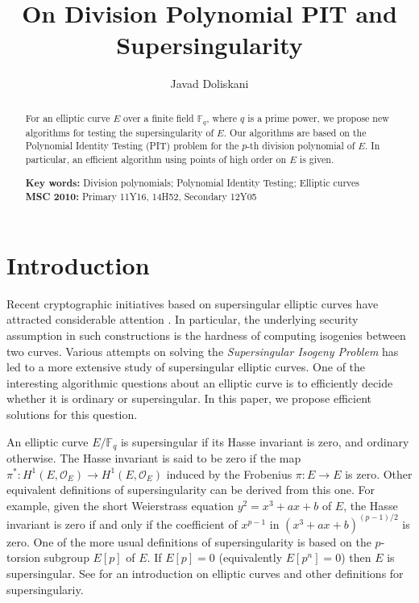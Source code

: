 \documentclass[12pt]{article}
\title{On Division Polynomial PIT and Supersingularity}
\author[1]{Javad Doliskani}
\affil[1]{\small Institute for Quantum Computing, University of Waterloo}
\date{}
\theoremstyle{plain}
\theoremstyle{definition}
\def\F{\ensuremath{\mathbb{F}}}
\begin{document}
\maketitle

\begin{abstract}
	\noindent For an elliptic curve $E$ over a finite field $\F_q$, where $q$ is a prime power, we 
	propose new algorithms for testing the supersingularity of $E$. Our algorithms are based on the 
	Polynomial Identity Testing (PIT) problem for the $p$-th division polynomial of $E$. In 
	particular, an efficient algorithm using points of high order on $E$ is given.
	
	\vspace*{7mm}
	\noindent\textbf{Key words:} Division polynomials; Polynomial Identity Testing; Elliptic curves 
	\\
	\noindent\textbf{MSC 2010:} Primary 11Y16, 14H52, Secondary 12Y05
\end{abstract}




\section{Introduction}
\label{sec:intro}

Recent cryptographic initiatives based on supersingular elliptic curves have attracted considerable 
attention \cite{Jao2011, Jao2014, Charles2009}. In particular, the underlying security assumption 
in such constructions is the hardness of computing isogenies between two curves. Various attempts 
on solving the \textit{Supersingular Isogeny Problem} has led to a more extensive study of 
supersingular elliptic curves. One of the interesting algorithmic questions about an elliptic curve 
is to efficiently decide whether it is ordinary or supersingular. In this paper, we propose 
efficient solutions for this question.

An elliptic curve $E / \F_q$ is supersingular if its Hasse invariant is zero, and ordinary 
otherwise. The Hasse invariant is said to be zero if the map $\pi^*: H^1(E, \mathscr{O}_E) 
\rightarrow H^1(E, \mathscr{O}_E)$ induced by the Frobenius $\pi: E \rightarrow E$ is zero. Other 
equivalent definitions of supersingularity can be derived from this one. For example, given the 
short Weierstrass equation $y^2 = x^3 + ax + b$ of $E$, the Hasse invariant is zero if and only if 
the coefficient of $x^{p - 1}$ in $(x^3 + ax + b)^{(p - 1) / 2}$ is zero. One of the more usual 
definitions of supersingularity is based on the $p$-torsion subgroup $E[p]$ of $E$. If $E[p] = 0$ 
(equivalently $E[p^n] = 0$) then $E$ is supersingular. See \cite{Husemoeller1987} for an 
introduction on elliptic curves and other definitions for supersingulariy. 
\end{document}
